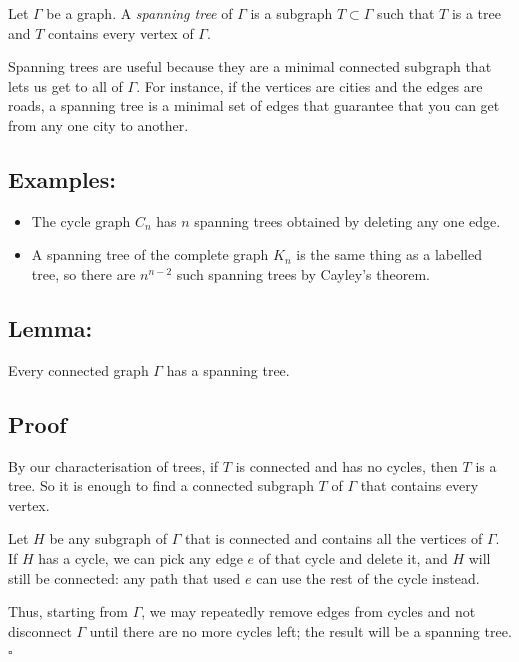 \documentclass[]{article}
\begin{document}
Let \(\Gamma\) be a graph. A \emph{spanning tree} of \(\Gamma\) is a
subgraph \(T\subset \Gamma\) such that \(T\) is a tree and \(T\)
contains every vertex of \(\Gamma\).

Spanning trees are useful because they are a minimal connected subgraph
that lets us get to all of \(\Gamma\). For instance, if the vertices are
cities and the edges are roads, a spanning tree is a minimal set of
edges that guarantee that you can get from any one city to another.

\subsection{Examples:}\label{examples-2}

\begin{itemize}
\item
  The cycle graph \(C_n\) has \(n\) spanning trees obtained by deleting
  any one edge.
\item
  A spanning tree of the complete graph \(K_n\) is the same thing as a
  labelled tree, so there are \(n^{n-2}\) such spanning trees by
  Cayley's theorem.
\end{itemize}

\subsection{Lemma:}\label{lemma-6}

Every connected graph \(\Gamma\) has a spanning tree.

\subsection{Proof}\label{proof-10}

By our characterisation of trees, if \(T\) is connected and has no
cycles, then \(T\) is a tree. So it is enough to find a connected
subgraph \(T\) of \(\Gamma\) that contains every vertex.

Let \(H\) be any subgraph of \(\Gamma\) that is connected and contains
all the vertices of \(\Gamma\). If \(H\) has a cycle, we can pick any
edge \(e\) of that cycle and delete it, and \(H\) will still be
connected: any path that used \(e\) can use the rest of the cycle
instead.

Thus, starting from \(\Gamma\), we may repeatedly remove edges from
cycles and not disconnect \(\Gamma\) until there are no more cycles
left; the result will be a spanning tree. \(\square\)
\end{document}
